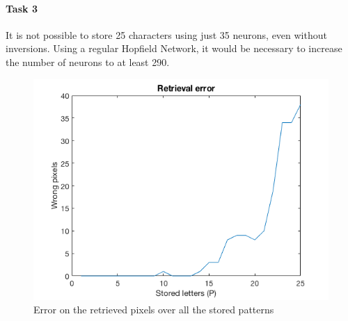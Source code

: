 \documentclass[a4paper, 10pt]{article}
\begin{document}
\paragraph{Task 3} It is not possible to store 25 characters using just 35 neurons, 
even without inversions. Using a regular Hopfield Network, it would be necessary
to increase the number of neurons to at least 290.

 

\begin{figure}[htb]
  \centering
  \includegraphics[width=0.5\linewidth]{./project/letters/pattern_error.png}
  \caption{Error on the retrieved pixels over all the stored patterns}
  \label{fig:spurious}
\end{figure}

    
\end{document}
